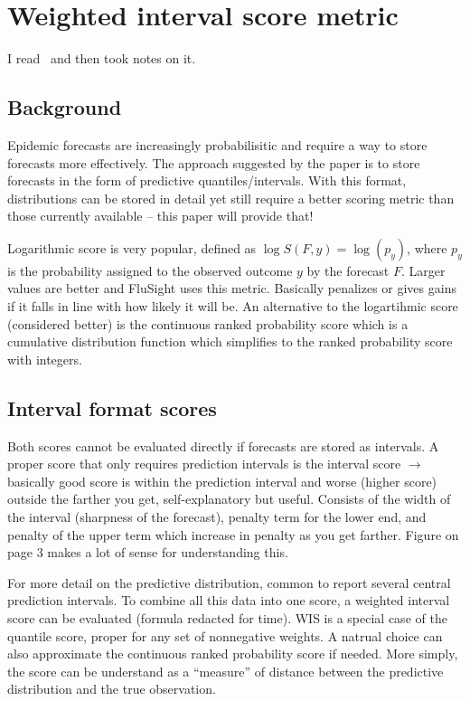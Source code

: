 \documentclass[12pt]{article}
\begin{document}
\section{Weighted interval score metric}
I read~\cite{bracher21} and then took notes on it.

\subsection{Background}
Epidemic forecasts are increasingly probabilisitic and require a way to store forecasts more effectively. The approach suggested by the paper is to store forecasts in the form of predictive quantiles/intervals. With this format, distributions can be stored in detail yet still require a better scoring metric than those currently available -- this paper will provide that!

Logarithmic score is very popular, defined as $\log S(F,y) = \log(p_y)$, where $p_y$ is the probability assigned to the observed outcome $y$ by the forecast $F$. Larger values are better and FluSight uses this metric. Basically penalizes or gives gains if it falls in line with how likely it will be. An alternative to the logartihmic score (considered better) is the continuous ranked probability score which is a cumulative distribution function which simplifies to the ranked probability score with integers.

\subsection{Interval format scores}
Both scores cannot be evaluated directly if forecasts are stored as intervals. A proper score that only requires prediction intervals is the interval score $\rightarrow$ basically good score is within the prediction interval and worse (higher score) outside the farther you get, self-explanatory but useful. Consists of the width of the interval (sharpness of the forecast), penalty term for the lower end, and penalty of the upper term which increase in penalty as you get farther. Figure on page 3 makes a lot of sense for understanding this. 

For more detail on the predictive distribution, common to report several central prediction intervals. To combine all this data into one score, a weighted interval score can be evaluated (formula redacted for time). WIS is a special case of the quantile score, proper for any set of nonnegative weights. A natrual choice can also approximate the continuous ranked probability score if needed. More simply, the score can be understand as a ``measure'' of distance between the predictive distribution and the true observation. 
\end{document}
